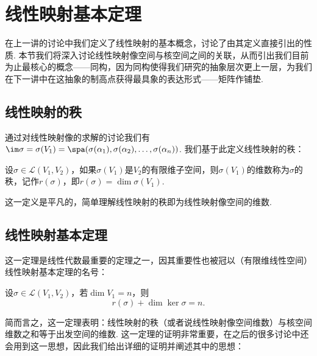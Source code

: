 \chapter{线性映射基本定理}

在上一讲的讨论中我们定义了线性映射的基本概念，讨论了由其定义直接引出的性质. 本节我们将深入讨论线性映射像空间与核空间之间的关联，从而引出我们目前为止最核心的概念——同构，因为同构使得我们研究的抽象层次更上一层，为我们在下一讲中在这抽象的制高点获得最具象的表达形式——矩阵作铺垫.

\section{线性映射的秩}

通过对线性映射像的求解的讨论我们有$\im \sigma=\sigma(V_1)=\spa(\sigma(\alpha_1),\sigma(\alpha_2),\ldots,\sigma(\alpha_n))$. 我们基于此定义线性映射的秩：
\begin{definition}
    设$\sigma\in \mathcal{L}(V_1,V_2)$，如果$\sigma(V_1)$是$V_2$的有限维子空间，则$\sigma(V_1)$的维数称为$\sigma$的秩，记作$r(\sigma)$，即$r(\sigma)=\dim \sigma(V_1)$.
\end{definition}

这一定义是平凡的，简单理解线性映射的秩即为线性映射像空间的维数.

\section{线性映射基本定理}

这一定理是线性代数最重要的定理之一，因其重要性也被冠以（有限维线性空间）线性映射基本定理的名号：
\begin{theorem}[线性映射基本定理]\label{thm:6:线性映射基本定理}
    设$\sigma \in \mathcal{L}(V_1,V_2)$，若$\dim V_1=n$，则
    \[r(\sigma)+\dim\ker\sigma=n.\]
\end{theorem}
简而言之，这一定理表明：线性映射的秩（或者说线性映射像空间维数）与核空间维数之和等于出发空间的维数. 这一定理的证明非常重要，在之后的很多讨论中还会用到这一思想，因此我们给出详细的证明并阐述其中的思想：

